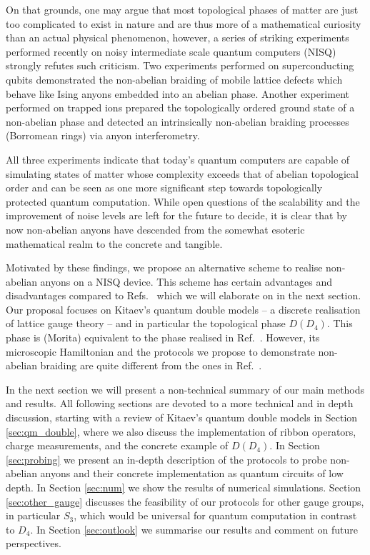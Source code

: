 \documentclass[two column]{article}
\newcommand{\caro}[1]{\textcolor{red}{[#1]}}
\begin{document}
On that grounds, one may argue that most topological phases of matter are just too complicated to exist in nature and are thus more of a mathematical curiosity than an actual physical phenomenon, however, a series of striking experiments \cite{iqbal2023creation,xu,andersen2022observation} performed recently on noisy intermediate scale quantum computers (NISQ) strongly refutes such  criticism. Two experiments performed on superconducting qubits \cite{xu,andersen2022observation} demonstrated the non-abelian braiding of mobile lattice defects which behave like Ising anyons embedded into an abelian phase. Another experiment performed on trapped ions \cite{iqbal2023creation} prepared the topologically ordered ground state of a non-abelian phase and detected an intrinsically non-abelian braiding processes (Borromean rings) via anyon interferometry. 


All three experiments indicate that today's quantum computers are capable of simulating states of matter whose complexity exceeds that of abelian topological order and can be seen as one more significant step towards topologically protected quantum computation. While open questions of the scalability and the improvement of noise levels are left for the future to decide, it is clear that by now non-abelian anyons have descended from the somewhat esoteric mathematical realm to the concrete and tangible.

Motivated by these findings, we propose an alternative scheme to realise non-abelian anyons on a NISQ device. This scheme has certain advantages and disadvantages compared to Refs.~\cite{iqbal2023creation,xu,andersen2022observation} which we will elaborate on in the next section. Our proposal focuses on Kitaev's quantum double models -- a discrete realisation of lattice gauge theory -- and in particular the topological phase $D(D_4)$. This phase is (Morita) equivalent to the phase realised in Ref.~\cite{iqbal2023creation}. However, its microscopic Hamiltonian and the protocols we propose to demonstrate non-abelian braiding are quite different from the ones in Ref.~\cite{iqbal2023creation}. 

In the next section we will present a non-technical summary of our main methods and results. All following sections are devoted to a more technical and in depth discussion, starting with a review of Kitaev's quantum double models in Section \ref{sec:qm_double}, where we also discuss the implementation of ribbon operators, charge measurements, and the concrete example of $D(D_4)$. In Section \ref{sec:probing} we present an in-depth description of the protocols to probe non-abelian anyons and their concrete implementation as quantum circuits of low depth. In Section \ref{sec:num} we show the results of numerical simulations. Section \ref{sec:other_gauge} discusses the feasibility of our protocols for other gauge groups, in particular $S_3$, which would be universal for quantum computation in contrast to $D_4$. In Section \ref{sec:outlook} we summarise our results and comment on future perspectives.
\end{document}
